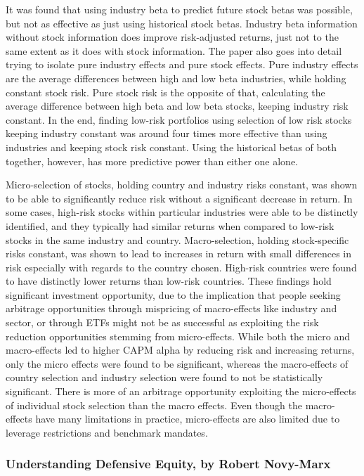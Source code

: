 \documentclass[12pt,twoside]{reedthesis}
\theoremstyle{definition}
\theoremstyle{definition}
\theoremstyle{definition}
\theoremstyle{remark}
\begin{document}
It was found that using industry beta to predict future stock betas was
possible, but not as effective as just using historical stock betas.
Industry beta information without stock information does improve
risk-adjusted returns, just not to the same extent as it does with stock
information. The paper also goes into detail trying to isolate pure
industry effects and pure stock effects. Pure industry effects are the
average differences between high and low beta industries, while holding
constant stock risk. Pure stock risk is the opposite of that,
calculating the average difference between high beta and low beta
stocks, keeping industry risk constant. In the end, finding low-risk
portfolios using selection of low risk stocks keeping industry constant
was around four times more effective than using industries and keeping
stock risk constant. Using the historical betas of both together,
however, has more predictive power than either one alone.

Micro-selection of stocks, holding country and industry risks constant,
was shown to be able to significantly reduce risk without a significant
decrease in return. In some cases, high-risk stocks within particular
industries were able to be distinctly identified, and they typically had
similar returns when compared to low-risk stocks in the same industry
and country. Macro-selection, holding stock-specific risks constant, was
shown to lead to increases in return with small differences in risk
especially with regards to the country chosen. High-risk countries were
found to have distinctly lower returns than low-risk countries. These
findings hold significant investment opportunity, due to the implication
that people seeking arbitrage opportunities through mispricing of
macro-effects like industry and sector, or through ETFs might not be as
successful as exploiting the risk reduction opportunities stemming from
micro-effects. While both the micro and macro-effects led to higher CAPM
alpha by reducing risk and increasing returns, only the micro effects
were found to be significant, whereas the macro-effects of country
selection and industry selection were found to not be statistically
significant. There is more of an arbitrage opportunity exploiting the
micro-effects of individual stock selection than the macro effects. Even
though the macro-effects have many limitations in practice,
micro-effects are also limited due to leverage restrictions and
benchmark mandates.

\subsubsection{Understanding Defensive Equity, by Robert
Novy-Marx}\label{understanding-defensive-equity-by-robert-novy-marx}
\end{document}
